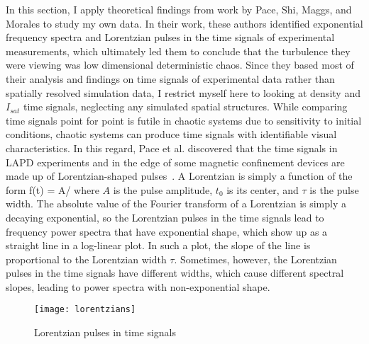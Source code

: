 In this section, I apply theoretical findings from work by Pace, Shi, Maggs, and Morales to study my own data. In their work, these authors identified exponential frequency spectra and 
Lorentzian pulses in the time signals of experimental measurements, which ultimately led them to conclude that the turbulence they were viewing was low dimensional deterministic chaos.
Since they based most of their analysis and findings on time signals of experimental data rather than spatially resolved simulation data, 
I restrict myself here to looking at density and $I_{sat}$ time signals, neglecting any simulated spatial structures.
While comparing time signals point for point is futile in chaotic systems due to sensitivity to initial conditions,
chaotic systems can produce time signals with identifiable visual characteristics.
In this regard, Pace et al. discovered that the time signals in LAPD experiments and in the edge of some magnetic confinement devices
are made up of Lorentzian-shaped pulses~\cite{pace2008a,pace2008b}. A Lorentzian is simply a function of the form
\beq
\label{lorentz_eqn}
f(t) = A/
\eeq
where $A$ is the pulse amplitude, $t_0$ is its center, and $\tau$ is the pulse width. The absolute value of the Fourier transform of a Lorentzian is simply a decaying exponential, so
the Lorentzian pulses in the time signals lead to frequency power spectra that have exponential shape, which show up as a straight line in a log-linear plot. In such a plot, the slope of the line
is proportional to the Lorentzian width $\tau$. Sometimes, however, the Lorentzian
pulses in the time signals have different widths, which cause different spectral slopes, leading to power spectra with non-exponential shape. 

\begin{figure}
\centerline{\texttt{[image: lorentzians]}}
\caption{Lorentzian pulses in time signals}
\label{lorentzians}
\end{figure}

